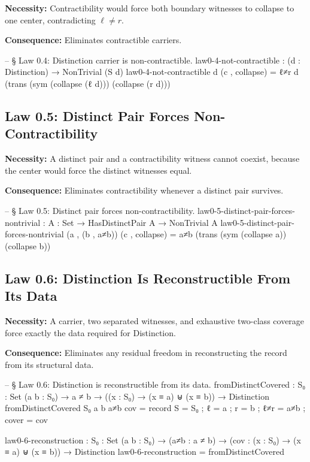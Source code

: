 \documentclass[11pt,a4paper]{book}
\def\texttt#1{#1}%
\begin{document}
\textbf{Necessity:} Contractibility would force both boundary witnesses to collapse to one center, contradicting $\ell \neq r$.

\textbf{Consequence:} Eliminates contractible carriers.

\begin{code}
-- § Law 0.4: Distinction carrier is non-contractible.
law0-4-not-contractible : (d : Distinction) → NonTrivial (S d)
law0-4-not-contractible d (c , collapse) =
  ℓ≠r d (trans (sym (collapse (ℓ d))) (collapse (r d)))
\end{code}

\subsection{Law 0.5: Distinct Pair Forces Non-Contractibility}

\textbf{Necessity:} A distinct pair and a contractibility witness cannot coexist, because the center would force the distinct witnesses equal.

\textbf{Consequence:} Eliminates contractibility whenever a distinct pair survives.

\begin{code}
-- § Law 0.5: Distinct pair forces non-contractibility.
law0-5-distinct-pair-forces-nontrivial :
  {A : Set} → HasDistinctPair A → NonTrivial A
law0-5-distinct-pair-forces-nontrivial (a , (b , a≠b)) (c , collapse) =
  a≠b (trans (sym (collapse a)) (collapse b))
\end{code}

\subsection{Law 0.6: Distinction Is Reconstructible From Its Data}

\textbf{Necessity:} A carrier, two separated witnesses, and exhaustive two-class coverage force exactly the data required for \texttt{Distinction}.

\textbf{Consequence:} Eliminates any residual freedom in reconstructing the record from its structural data.

\begin{code}
-- § Law 0.6: Distinction is reconstructible from its data.
fromDistinctCovered :
  {S₀ : Set} (a b : S₀) →
  a ≠ b →
  ((x : S₀) → (x ≡ a) ⊎ (x ≡ b)) →
  Distinction
fromDistinctCovered {S₀} a b a≠b cov = record
  { S = S₀ ; ℓ = a ; r = b ; ℓ≠r = a≠b ; cover = cov }

law0-6-reconstruction :
  {S₀ : Set} (a b : S₀) →
  (a≠b : a ≠ b) →
  (cov : (x : S₀) → (x ≡ a) ⊎ (x ≡ b)) →
  Distinction
law0-6-reconstruction = fromDistinctCovered
\end{code}
\end{document}
